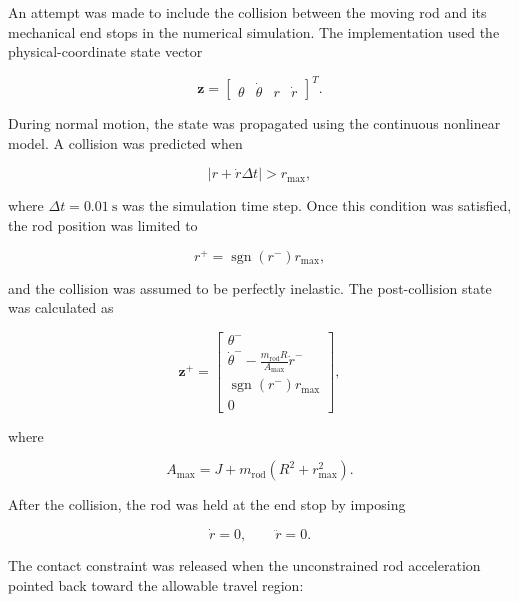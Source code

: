 An attempt was made to include the collision between the moving rod and its mechanical end stops in the numerical simulation. The implementation used the physical-coordinate state vector

\begin{equation}
\mathbf{z}
=
\begin{bmatrix}
\theta &
\dot{\theta} &
r &
\dot{r}
\end{bmatrix}^{T}.
\end{equation}

During normal motion, the state was propagated using the continuous nonlinear model. A collision was predicted when

\begin{equation}
\left|r+\dot{r}\Delta t\right|>r_{\max},
\label{eq:predicted-collision-condition}
\end{equation}

where $\Delta t=0.01~\mathrm{s}$ was the simulation time step. Once this condition was satisfied, the rod position was limited to

\begin{equation}
r^{+}
=
\operatorname{sgn}(r^{-})r_{\max},
\end{equation}

and the collision was assumed to be perfectly inelastic. The post-collision state was calculated as

\begin{equation}
\mathbf{z}^{+}
=
\begin{bmatrix}
\theta^{-}
\\[2pt]
\displaystyle
\dot{\theta}^{-}
-
\frac{m_{\mathrm{rod}}R}{A_{\max}}
\dot{r}^{-}
\\[8pt]
\operatorname{sgn}(r^{-})r_{\max}
\\[2pt]
0
\end{bmatrix},
\label{eq:implemented-collision-reset}
\end{equation}

where

\begin{equation}
A_{\max}
=
J
+
m_{\mathrm{rod}}
\left(
R^2+r_{\max}^2
\right).
\end{equation}

After the collision, the rod was held at the end stop by imposing

\begin{equation}
\dot{r}=0,
\qquad
\ddot{r}=0.
\end{equation}

The contact constraint was released when the unconstrained rod acceleration pointed back toward the allowable travel region:

